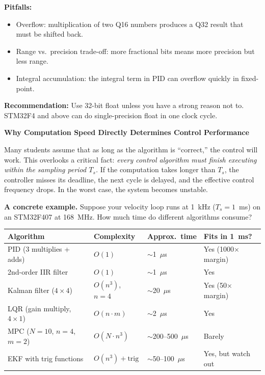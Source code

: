 \textbf{Pitfalls:}
\begin{itemize}
    \item Overflow: multiplication of two Q16 numbers produces a Q32 result that must be shifted back.
    \item Range vs.\ precision trade-off: more fractional bits means more precision but less range.
    \item Integral accumulation: the integral term in PID can overflow quickly in fixed-point.
\end{itemize}

\textbf{Recommendation:} Use 32-bit float unless you have a strong reason not to. STM32F4 and above can do single-precision float in one clock cycle.

\vspace{0.5em}
\begin{mdframed}[linewidth=1pt, innertopmargin=10pt, innerbottommargin=10pt]
\textbf{Why Computation Speed Directly Determines Control Performance}

\vspace{0.3em}
Many students assume that as long as the algorithm is ``correct,'' the control will work. This overlooks a critical fact: \textit{every control algorithm must finish executing within the sampling period $T_s$.} If the computation takes longer than $T_s$, the controller misses its deadline, the next cycle is delayed, and the effective control frequency drops. In the worst case, the system becomes unstable.

\textbf{A concrete example.} Suppose your velocity loop runs at 1~kHz ($T_s = 1$~ms) on an STM32F407 at 168~MHz. How much time do different algorithms consume?

\begin{center}
\begin{tabular}{llll}
\toprule
\textbf{Algorithm} & \textbf{Complexity} & \textbf{Approx.\ time} & \textbf{Fits in 1~ms?} \\
\midrule
PID (3 multiplies + adds) & $O(1)$ & $\sim$1~$\mu$s & Yes (1000$\times$ margin) \\
2nd-order IIR filter & $O(1)$ & $\sim$1~$\mu$s & Yes \\
Kalman filter ($4 \times 4$) & $O(n^3)$, $n=4$ & $\sim$20~$\mu$s & Yes (50$\times$ margin) \\
LQR (gain multiply, $4 \times 1$) & $O(n \cdot m)$ & $\sim$2~$\mu$s & Yes \\
MPC ($N=10$, $n=4$, $m=2$) & $O(N \cdot n^3)$ & $\sim$200--500~$\mu$s & Barely \\
EKF with trig functions & $O(n^3) + \text{trig}$ & $\sim$50--100~$\mu$s & Yes, but watch out \\
\bottomrule
\end{tabular}
\end{center}


\end{mdframed}

